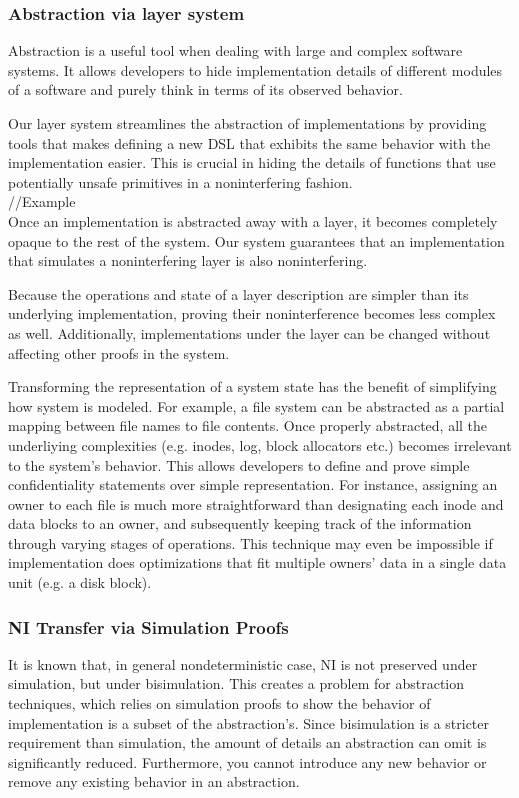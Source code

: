 \subsubsection*{Abstraction via layer system}
Abstraction is a useful tool when dealing with large and complex software systems.
It allows developers to hide implementation details of different modules of a software and purely think in terms of its observed behavior.

Our layer system streamlines the abstraction of implementations by providing tools that makes defining a new DSL that exhibits the same behavior with the implementation easier.
This is crucial in hiding the details of functions that use potentially unsafe primitives in a noninterfering fashion.\\

//Example\\

Once an implementation is abstracted away with a layer, it becomes completely opaque to the rest of the system. Our system guarantees that an implementation that simulates a noninterfering layer is also noninterfering.

Because the operations and state of a layer description are simpler than its underlying implementation, proving their noninterference becomes less complex as well. Additionally, implementations under the layer can be changed without affecting other proofs in the system.

Transforming the representation of a system state has the benefit of simplifying how system is modeled. For example, a file system can be abstracted as a partial mapping between file names to file contents. Once properly abstracted, all the underliying complexities (e.g. inodes, log, block allocators etc.) becomes irrelevant to the system's behavior. This allows developers to define and prove simple confidentiality statements over simple representation. For instance, assigning an owner to each file is much more straightforward than designating each inode and data blocks to an owner, and subsequently keeping track of the information through varying stages of operations. This technique may even be impossible if implementation does optimizations that fit multiple owners' data in a single data unit (e.g. a disk block).

\subsubsection*{NI Transfer via Simulation Proofs}
It is known that, in general nondeterministic case, NI is not preserved under simulation, but under bisimulation. This creates a problem for abstraction techniques, which relies on simulation proofs to show the behavior of implementation is a subset of the abstraction's. Since bisimulation is a stricter requirement than simulation, the amount of details an abstraction can omit is significantly reduced. Furthermore, you cannot introduce any new behavior or remove any existing behavior in an abstraction.

